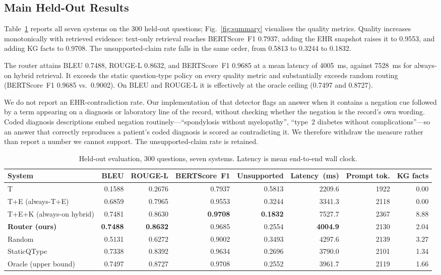 \documentclass[conference]{IEEEtran}
\begin{document}
\subsection{Main Held-Out Results}

Table~\ref{tab:main} reports all seven systems on the 300 held-out
questions; Fig.~\ref{fig:summary} visualises the quality metrics.
Quality increases monotonically with retrieved evidence: text-only
retrieval reaches BERTScore~F1 0.7937, adding the EHR snapshot raises
it to 0.9553, and adding KG facts to 0.9708. The unsupported-claim
rate falls in the same order, from 0.5813 to 0.3244 to 0.1832.

The router attains BLEU 0.7488, ROUGE-L 0.8632, and BERTScore~F1
0.9685 at a mean latency of 4005~ms, against 7528~ms for always-on
hybrid retrieval. It exceeds the static question-type policy on every
quality metric and substantially exceeds random routing
(BERTScore~F1 0.9685 vs.\ 0.9002). On BLEU and ROUGE-L it is
effectively at the oracle ceiling (0.7497 and 0.8727).

We do not report an EHR-contradiction rate. Our implementation of that
detector flags an answer when it contains a negation cue followed by a
term appearing on a diagnosis or laboratory line of the record, without
checking whether the negation is the record's own wording. Coded
diagnosis descriptions embed negation routinely---``spondylosis without
myelopathy'', ``type~2 diabetes without complications''---so an answer
that correctly reproduces a patient's coded diagnosis is scored as
contradicting it. We therefore withdraw the measure rather than report
a number we cannot support. The unsupported-claim rate is retained.

\begin{table}[t]
\centering
\small
\setlength{\tabcolsep}{5pt}
\caption{Held-out evaluation, 300 questions, seven systems. Latency is mean end-to-end wall clock.}
\label{tab:main}
\begin{tabular}{lrrrrrrr}
\toprule
System & BLEU & ROUGE-L & BERTScore~F1 & Unsupported & Latency~(ms) & Prompt tok. & KG facts \\
\midrule
T                            & 0.1588 & 0.2676 & 0.7937 & 0.5813 & 2209.6 & 1922 & 0.00 \\
T+E (always-T+E)             & 0.6859 & 0.7965 & 0.9553 & 0.3244 & 3341.3 & 2118 & 0.00 \\
T+E+K (always-on hybrid)     & 0.7481 & 0.8630 & \textbf{0.9708} & \textbf{0.1832} & 7527.7 & 2367 & 8.88 \\
\textbf{Router (ours)}       & \textbf{0.7488} & \textbf{0.8632} & 0.9685 & 0.2554 & \textbf{4004.9} & 2130 & 2.04 \\
Random                       & 0.5131 & 0.6272 & 0.9002 & 0.3493 & 4297.6 & 2139 & 3.27 \\
StaticQType                  & 0.7338 & 0.8392 & 0.9634 & 0.2696 & 3790.0 & 2101 & 1.34 \\
Oracle (upper bound)         & 0.7497 & 0.8727 & 0.9708 & 0.2552 & 3961.7 & 2119 & 1.66 \\
\bottomrule
\end{tabular}
\end{table}
\end{document}
